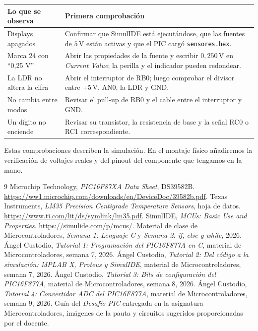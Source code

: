 \documentclass[11pt,a4paper]{article}
\begin{document}
\begin{center}
\small
\begin{tabularx}{\linewidth}{@{}lX@{}}
\toprule
Lo que se observa & Primera comprobación \\
\midrule
Displays apagados & Confirmar que SimulIDE está ejecutándose, que las fuentes de \(5\,\mathrm V\) están activas y que el PIC cargó \texttt{sensores.hex}. \\
Marca 24 con ``0,25 V'' & Abrir las propiedades de la fuente y escribir \(0{,}250\,\mathrm V\) en \emph{Current Value}; la perilla y el indicador pueden redondear. \\
La LDR no altera la cifra & Abrir el interruptor de RB0; luego comprobar el divisor entre \(+5\,\mathrm V\), AN0, la LDR y GND. \\
No cambia entre modos & Revisar el pull-up de RB0 y el cable entre el interruptor y GND. \\
Un dígito no enciende & Revisar su transistor, la resistencia de base y la señal RC0 o RC1 correspondiente. \\
\bottomrule
\end{tabularx}
\end{center}

Estas comprobaciones describen la simulación. En el montaje físico añadiremos la verificación de voltajes reales y del pinout del componente que tengamos en la mano.

\begin{thebibliography}{9}
 Microchip Technology, \emph{PIC16F87XA Data Sheet}, DS39582B. \url{https://ww1.microchip.com/downloads/en/DeviceDoc/39582b.pdf}.
 Texas Instruments, \emph{LM35 Precision Centigrade Temperature Sensors}, hoja de datos. \url{https://www.ti.com/lit/ds/symlink/lm35.pdf}.
 SimulIDE, \emph{MCUs: Basic Use and Properties}. \url{https://simulide.com/p/mcus/}.
 Material de clase de Microcontroladores, \emph{Semana 1: Lenguaje C} y \emph{Semana 2: if, else y while}, 2026.
 Ángel Custodio, \emph{Tutorial 1: Programación del PIC16F877A en C}, material de Microcontroladores, semana 7, 2026.
 Ángel Custodio, \emph{Tutorial 2: Del código a la simulación: MPLAB X, Proteus y SimulIDE}, material de Microcontroladores, semana 7, 2026.
 Ángel Custodio, \emph{Tutorial 3: Bits de configuración del PIC16F877A}, material de Microcontroladores, semana 8, 2026.
 Ángel Custodio, \emph{Tutorial 4: Convertidor ADC del PIC16F877A}, material de Microcontroladores, semana 9, 2026.
 Guía del \emph{Desafío PIC} entregada en la asignatura Microcontroladores, imágenes de la pauta y circuitos sugeridos proporcionadas por el docente.
\end{thebibliography}
\end{document}
